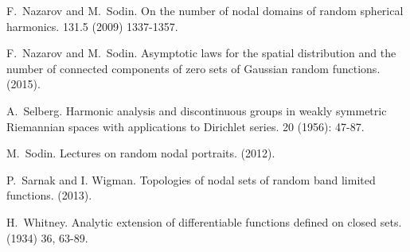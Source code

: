 \documentclass[11pt,reqno]{amsart}
\theoremstyle{definition}
\begin{document}
\begin{thebibliography}{1}
 F.~Nazarov and M.~Sodin.
\newblock On the number of nodal domains of random spherical harmonics.
 131.5 (2009) 1337-1357.

 F.~Nazarov and M.~Sodin.
\newblock Asymptotic laws for the spatial distribution and the number of connected components of zero sets of Gaussian random functions.
 (2015).


 A.~Selberg.
\newblock Harmonic analysis and discontinuous groups in weakly symmetric Riemannian spaces with applications to Dirichlet series.
  20 (1956): 47-87.

 M.~Sodin.
\newblock Lectures on random nodal portraits.
 (2012).

 P.~Sarnak and I. Wigman.
\newblock Topologies of nodal sets of random band limited functions.
 (2013).

 H.~Whitney.
\newblock Analytic extension of differentiable functions defined on closed sets. 
 (1934) 36, 63-89.

\end{thebibliography}
\end{document}
